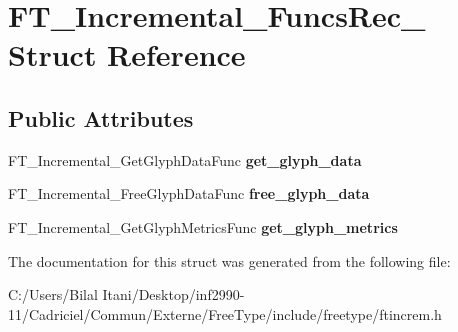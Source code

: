 \hypertarget{struct_f_t___incremental___funcs_rec__}{}\section{F\+T\+\_\+\+Incremental\+\_\+\+Funcs\+Rec\+\_\+ Struct Reference}
\label{struct_f_t___incremental___funcs_rec__}
\subsection*{Public Attributes}
\begin{DoxyCompactItemize}
\item 
F\+T\+\_\+\+Incremental\+\_\+\+Get\+Glyph\+Data\+Func {\bfseries get\+\_\+glyph\+\_\+data}\hypertarget{struct_f_t___incremental___funcs_rec___ac276b7ff9624b8d8bf144ab8d00538b4}{}\label{struct_f_t___incremental___funcs_rec___ac276b7ff9624b8d8bf144ab8d00538b4}

\item 
F\+T\+\_\+\+Incremental\+\_\+\+Free\+Glyph\+Data\+Func {\bfseries free\+\_\+glyph\+\_\+data}\hypertarget{struct_f_t___incremental___funcs_rec___a9201afcfda8c15be839aee04306dff0a}{}\label{struct_f_t___incremental___funcs_rec___a9201afcfda8c15be839aee04306dff0a}

\item 
F\+T\+\_\+\+Incremental\+\_\+\+Get\+Glyph\+Metrics\+Func {\bfseries get\+\_\+glyph\+\_\+metrics}\hypertarget{struct_f_t___incremental___funcs_rec___ac7d95e85357ab9d1893660b0628c1908}{}\label{struct_f_t___incremental___funcs_rec___ac7d95e85357ab9d1893660b0628c1908}

\end{DoxyCompactItemize}


The documentation for this struct was generated from the following file\+:\begin{DoxyCompactItemize}
\item 
C\+:/\+Users/\+Bilal Itani/\+Desktop/inf2990-\/11/\+Cadriciel/\+Commun/\+Externe/\+Free\+Type/include/freetype/ftincrem.\+h\end{DoxyCompactItemize}
